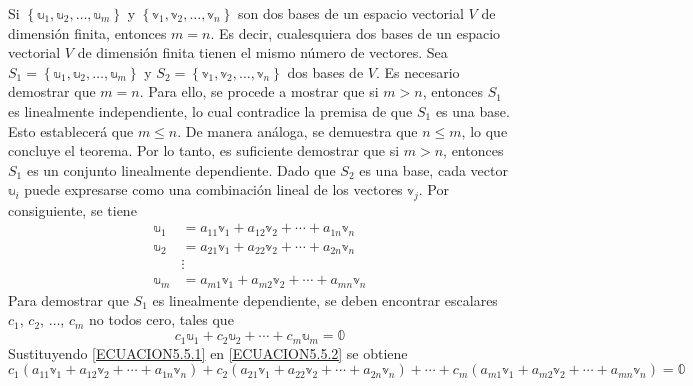 \begin{theorem}
    Si $\left\{ \mathbb{u}_1, \mathbb{u}_2, \dots, \mathbb{u}_m \right\}$ y $\left\{ \mathbb{v}_1, \mathbb{v}_2, \dots, \mathbb{v}_n \right\}$ son dos bases de un espacio vectorial $V$ de dimensión finita, entonces $m = n$. Es decir, cualesquiera dos bases de un espacio vectorial $V$ de dimensión finita tienen el mismo número de vectores. \newpage
    \demostracion Sea $S_1 = \left\{ \mathbb{u}_1, \mathbb{u}_2, \dots, \mathbb{u}_m \right\}$ y $S_2 = \left\{ \mathbb{v}_1, \mathbb{v}_2, \dots, \mathbb{v}_n \right\}$ dos bases de $V$. Es necesario demostrar que $m = n$. Para ello, se procede a mostrar que si $m > n$, entonces $S_1$ es linealmente independiente, lo cual contradice la premisa de que $S_1$ es una base. Esto establecerá que $m \leq n$. De manera análoga, se demuestra que $n \leq m$, lo que concluye el teorema. Por lo tanto, es suficiente demostrar que si $m > n$, entonces $S_1$ es un conjunto linealmente dependiente. Dado que $S_2$ es una base, cada vector $\mathbb{u}_i$ puede expresarse como una combinación lineal de los vectores $\mathbb{v}_j$. Por consiguiente, se tiene
    \begin{equation}
        \begin{aligned}
           \mathbb{u}_1 & = a_{11} \mathbb{v}_1 + a_{12} \mathbb{v}_2 + \cdots + a_{1n} \mathbb{v}_n \\
            \mathbb{u}_2 & = a_{21} \mathbb{v}_1 + a_{22} \mathbb{v}_2 + \cdots + a_{2n} \mathbb{v}_n \\
            & \vdots \\
            \mathbb{u}_m & = a_{m1} \mathbb{v}_1 + a_{m2} \mathbb{v}_2 + \cdots + a_{mn} \mathbb{v}_n
        \end{aligned} \label{ECUACION5.5.1}
    \end{equation}
    Para demostrar que $S_1$ es linealmente dependiente, se deben encontrar escalares $c_1$, $c_2$, $\dots$, $c_m$ no todos cero, tales que
    \begin{equation}
        c_1\mathbb{u}_1 + c_2\mathbb{u}_2 + \cdots + c_m\mathbb{u}_m = \mathbb{0} \label{ECUACION5.5.2}
    \end{equation}
    Sustituyendo \eqref{ECUACION5.5.1} en \eqref{ECUACION5.5.2} se obtiene
    $$c_1\left( a_{11} \mathbb{v}_1 + a_{12} \mathbb{v}_2 + \cdots + a_{1n} \mathbb{v}_n \right) + c_2\left( a_{21} \mathbb{v}_1 + a_{22} \mathbb{v}_2 + \cdots + a_{2n} \mathbb{v}_n \right) + \cdots + c_m\left( a_{m1} \mathbb{v}_1 + a_{m2} \mathbb{v}_2 + \cdots + a_{mn} \mathbb{v}_n \right) = \mathbb{0}$$

\end{theorem}
